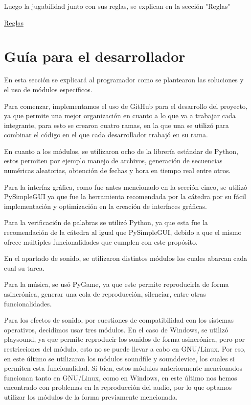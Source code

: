 \documentclass[12pt]{article}
\begin{document}
Luego la jugabilidad junto con sus reglas, se explican en la sección "Reglas" 

\hyperref[sec:reglas]{Reglas}


\section{Guía para el desarrollador}
En esta sección se explicará al programador como se plantearon las soluciones y el uso de módulos específicos.

Para comenzar, implementamos el uso de GitHub para el desarrollo del proyecto, ya que permite una mejor organización en cuanto a lo que va a trabajar cada integrante, para esto se crearon cuatro ramas, en la que una se utilizó para combinar el código en el que cada desarrollador trabajó en su rama.

En cuanto a los módulos, se utilizaron ocho de la librería estándar de Python, estos permiten por ejemplo manejo de archivos, generación de secuencias numéricas aleatorias, obtención de fechas y hora en tiempo real entre otros.

Para la interfaz gráfica, como fue antes mencionado en la sección cinco, se utilizó PySimpleGUI ya que fue la herramienta recomendada por la cátedra por su fácil implementación y optimización en la creación de interfaces gráficas.

Para la verificación de palabras se utilizó Python, ya que esta fue la recomendación de la cátedra al igual que PySimpleGUI, debido a que el mismo ofrece múltiples funcionalidades que cumplen con este propósito.

En el apartado de sonido, se utilizaron distintos módulos los cuales abarcan cada cual su tarea.

Para la música, se usó PyGame, ya que este permite reproducirla de forma asincrónica, generar una cola de reproducción, silenciar, entre otras funcionalidades.

Para los efectos de sonido, por cuestiones de compatibilidad con los sistemas operativos, decidimos usar tres módulos. En el caso de Windows, se utilizó playsound, ya que permite reproducir los sonidos de forma asincrónica, pero por restricciones del módulo, esto no se puede llevar a cabo en GNU/Linux. Por eso, en este último se utilizaron los módulos soundfile y sounddevice, los cuales si permiten esta funcionalidad. Si bien, estos módulos anteriormente mencionados funcionan tanto en GNU/Linux, como en Windows, en este último nos hemos encontrado con problemas en la reproducción del audio, por lo que optamos utilizar los módulos de la forma previamente mencionada.
\end{document}
